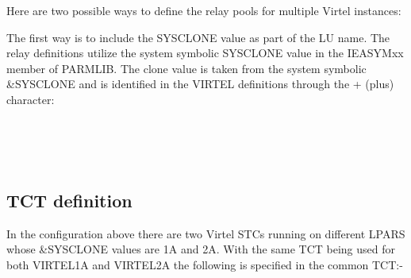 \documentclass[letterpaper,10pt,english]{sphinxmanual}
\begin{document}
Here are two possible ways to define the relay pools for multiple Virtel instances:

The first way is to include the SYSCLONE value as part of the LU name. The relay definitions utilize the system symbolic SYSCLONE value in the IEASYMxx member of PARMLIB. The clone value is taken from the system symbolic \&SYSCLONE and is identified in the VIRTEL definitions through the + (plus) character:

\begin{sphinxVerbatim}[commandchars=\\\{\}]
      
                             
                                    
                            
                                    
                            
                             
                                   
\end{sphinxVerbatim}


\subsection{TCT definition}
\label{\detokenize{connectivity_guide:tct-definition}}
In the configuration above there are two Virtel STCs running on different LPARS whose \&SYSCLONE values are 1A and 2A. With the same TCT being used for both VIRTEL1A and VIRTEL2A the following is specified in the common TCT:-
\end{document}

